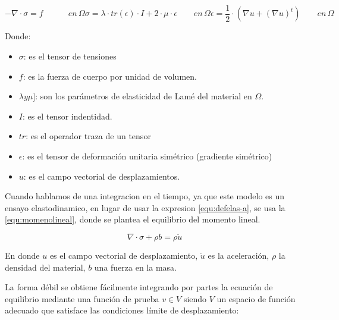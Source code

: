 \documentclass[12pt, a4paper]{article}
\begin{document}
\begin{subequations}
	\begin{equation}
		- \nabla \cdot \sigma  = f  \quad \quad \quad en \, \Omega
		\label{equ:defelas-a}
	\end{equation}
	\begin{equation}
		\sigma  = \lambda \cdot tr(\epsilon) \cdot I + 2 \cdot \mu \cdot \epsilon \quad \quad en \, \Omega
		\label{equ:defelas-b}
	\end{equation}
	\begin{equation}
		\epsilon  = \frac{1}{2} \cdot (\nabla u + (\nabla u)^t) \quad \quad en \, \Omega
		\label{equ:defelas-c}
	\end{equation}
	\label{equ:defelas}
\end{subequations}

Donde:
\begin{itemize}
	\item $\sigma$: es el tensor de tensiones
	\item $f$: es la fuerza de cuerpo por unidad de volumen.
	\item $\lambda y \mu]$: son los parámetros de elasticidad de Lamé del material en $\Omega$.
	\item $I$: es el tensor indentidad.
	\item $tr$: es el operador traza de un tensor
	\item $\epsilon$: es el tensor de deformación unitaria simétrico (gradiente simétrico)
	\item $u$: es el campo vectorial de desplazamientos. 
\end{itemize}

Cuando hablamos de una integracion en el tiempo, ya que este modelo es un ensayo elastodinamico, en lugar de usar la expresion \ref{equ:defelas-a}, se usa la \ref{equ:momenolineal}, donde se plantea el equilibrio del momento lineal.

\begin{equation}
	\nabla \cdot \sigma+ \rho b = \rho \ddot{u}
	\label{equ:momenolineal}
\end{equation}

En donde $u$ es el campo vectorial de desplazamiento, $\ddot{u}$ es la aceleración, $\rho$ la densidad del material, $b$ una fuerza en la masa.

La forma débil se obtiene fácilmente integrando por partes la ecuación de equilibrio mediante una función de prueba $v \in V$ siendo $V$ un espacio de función adecuado que satisface las condiciones límite de desplazamiento:
\end{document}
